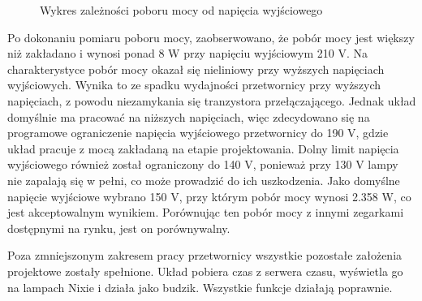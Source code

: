 \documentclass[../main.tex]{subfiles}
\begin{document}
\begin{figure}[H]
  \centering
  \caption{Wykres zależności poboru mocy od napięcia wyjściowego}
  \label{fig:power}
\end{figure}

Po dokonaniu pomiaru poboru mocy, zaobserwowano, że pobór mocy jest większy niż zakładano i wynosi ponad 8 W przy napięciu wyjściowym 210 V.
Na charakterystyce pobór mocy okazał się nieliniowy przy wyższych napięciach wyjściowych. Wynika to ze spadku wydajności przetwornicy przy wyższych napięciach,
z powodu niezamykania się tranzystora przełączającego. Jednak układ domyślnie ma pracować na niższych napięciach, więc 
zdecydowano się na programowe ograniczenie napięcia wyjściowego przetwornicy do 190 V, gdzie układ pracuje z mocą zakładaną na etapie projektowania. Dolny limit napięcia wyjściowego również
został ograniczony do 140 V, ponieważ przy 130 V lampy nie zapalają się w pełni, co może prowadzić do ich uszkodzenia. 
Jako domyślne napięcie wyjściowe wybrano 150 V, przy którym pobór mocy wynosi 2.358 W, co jest akceptowalnym wynikiem.
Porównując ten pobór mocy z innymi zegarkami dostępnymi na rynku, jest on porównywalny.

Poza zmniejszonym zakresem pracy przetwornicy wszystkie pozostałe założenia projektowe zostały spełnione. Układ 
pobiera czas z serwera czasu, wyświetla go na lampach Nixie i działa jako budzik. Wszystkie funkcje działają poprawnie.
\end{document}
